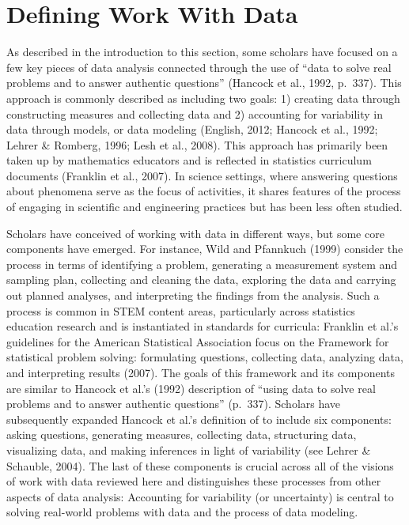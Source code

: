 \documentclass[]{book}
\theoremstyle{definition}
\theoremstyle{definition}
\theoremstyle{definition}
\theoremstyle{remark}
\begin{document}
\section{Defining Work With Data}\label{defining-work-with-data}

As described in the introduction to this section, some scholars have
focused on a few key pieces of data analysis connected through the use
of ``data to solve real problems and to answer authentic questions''
(Hancock et al., 1992, p.~337). This approach is commonly described as
including two goals: 1) creating data through constructing measures and
collecting data and 2) accounting for variability in data through
models, or data modeling (English, 2012; Hancock et al., 1992; Lehrer \&
Romberg, 1996; Lesh et al., 2008). This approach has primarily been
taken up by mathematics educators and is reflected in statistics
curriculum documents (Franklin et al., 2007). In science settings, where
answering questions about phenomena serve as the focus of activities, it
shares features of the process of engaging in scientific and engineering
practices but has been less often studied.

Scholars have conceived of working with data in different ways, but some
core components have emerged. For instance, Wild and Pfannkuch (1999)
consider the process in terms of identifying a problem, generating a
measurement system and sampling plan, collecting and cleaning the data,
exploring the data and carrying out planned analyses, and interpreting
the findings from the analysis. Such a process is common in STEM content
areas, particularly across statistics education research and is
instantiated in standards for curricula: Franklin et al.'s guidelines
for the American Statistical Association focus on the Framework for
statistical problem solving: formulating questions, collecting data,
analyzing data, and interpreting results (2007). The goals of this
framework and its components are similar to Hancock et al.'s (1992)
description of ``using data to solve real problems and to answer
authentic questions'' (p.~337). Scholars have subsequently expanded
Hancock et al.'s definition of to include six components: asking
questions, generating measures, collecting data, structuring data,
visualizing data, and making inferences in light of variability (see
Lehrer \& Schauble, 2004). The last of these components is crucial
across all of the visions of work with data reviewed here and
distinguishes these processes from other aspects of data analysis:
Accounting for variability (or uncertainty) is central to solving
real-world problems with data and the process of data modeling.
\end{document}
